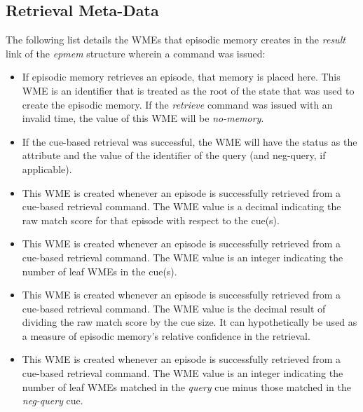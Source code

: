 \subsection{Retrieval Meta-Data}
\label{EPMEM-meta}
The following list details the WMEs that episodic memory creates in the \emph{result} link of the \emph{epmem} structure wherein a command was issued:

\begin{itemize}

\item {}

If episodic memory retrieves an episode, that memory is placed here. 
This WME is an identifier that is treated as the root of the state that was used to create the episodic memory. 
If the \emph{retrieve} command was issued with an invalid time, the value of this WME will be \emph{no-memory}.

\item {}

If the cue-based retrieval was successful, the WME will have the status as the attribute and the value of the identifier of the query (and neg-query, if applicable).

\item {}

This WME is created whenever an episode is successfully retrieved from a cue-based retrieval command. 
The WME value is a decimal indicating the raw match score for that episode with respect to the cue(s).

\item {}

This WME is created whenever an episode is successfully retrieved from a cue-based retrieval command.  
The WME value is an integer indicating the number of leaf WMEs in the cue(s).

\item {}

This WME is created whenever an episode is successfully retrieved from a cue-based retrieval command.  
The WME value is the decimal result of dividing the raw match score by the cue size.  
It can hypothetically be used as a measure of episodic memory's relative confidence in the retrieval.

\item {}

This WME is created whenever an episode is successfully retrieved from a cue-based retrieval command.  
The WME value is an integer indicating the number of leaf WMEs matched in the \emph{query} cue minus those matched in the \emph{neg-query} cue.


\end{itemize}
